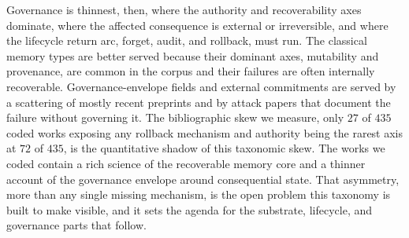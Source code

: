 Governance is thinnest, then, where the authority and recoverability axes dominate, where the affected consequence is external or irreversible, and where the lifecycle return arc, forget, audit, and rollback, must run. The classical memory types are better served because their dominant axes, mutability and provenance, are common in the corpus and their failures are often internally recoverable. Governance-envelope fields and external commitments are served by a scattering of mostly recent preprints and by attack papers that document the failure without governing it. The bibliographic skew we measure, only $27$ of $435$ coded works exposing any rollback mechanism and authority being the rarest axis at $72$ of $435$, is the quantitative shadow of this taxonomic skew. The works we coded contain a rich science of the recoverable memory core and a thinner account of the governance envelope around consequential state. That asymmetry, more than any single missing mechanism, is the open problem this taxonomy is built to make visible, and it sets the agenda for the substrate, lifecycle, and governance parts that follow.
